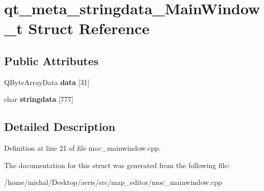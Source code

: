 \hypertarget{structqt__meta__stringdata__MainWindow__t}{\section{qt\-\_\-meta\-\_\-stringdata\-\_\-\-Main\-Window\-\_\-t Struct Reference}
\label{structqt__meta__stringdata__MainWindow__t}
}
\subsection*{Public Attributes}
\begin{DoxyCompactItemize}
\item 
\hypertarget{structqt__meta__stringdata__MainWindow__t_a25333e8c3c2c62e1ac051146bc6c454f}{Q\-Byte\-Array\-Data {\bfseries data} \mbox{[}31\mbox{]}}\label{structqt__meta__stringdata__MainWindow__t_a25333e8c3c2c62e1ac051146bc6c454f}

\item 
\hypertarget{structqt__meta__stringdata__MainWindow__t_a9d3ed196ceaa4fc8c2e817fbeed3fea8}{char {\bfseries stringdata} \mbox{[}777\mbox{]}}\label{structqt__meta__stringdata__MainWindow__t_a9d3ed196ceaa4fc8c2e817fbeed3fea8}

\end{DoxyCompactItemize}


\subsection{Detailed Description}


Definition at line 21 of file moc\-\_\-mainwindow.\-cpp.



The documentation for this struct was generated from the following file\-:\begin{DoxyCompactItemize}
\item 
/home/michal/\-Desktop/aeris/src/map\-\_\-editor/moc\-\_\-mainwindow.\-cpp\end{DoxyCompactItemize}
